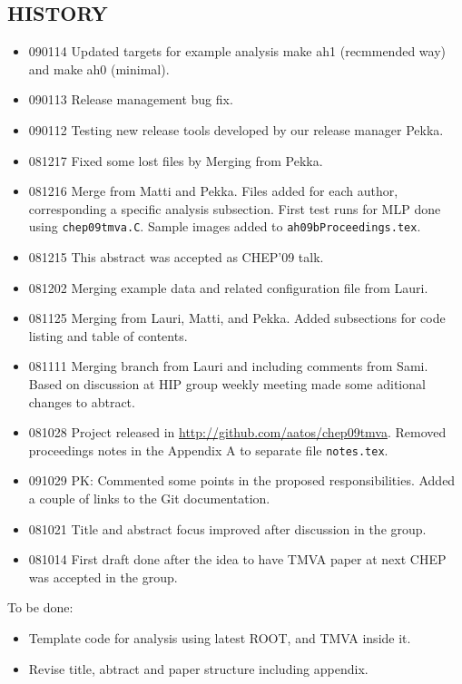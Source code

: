 \begin{appendix}
\section{HISTORY}
\begin{itemize}
\item 090114 Updated targets for example analysis make ah1 (recmmended way) and make ah0 (minimal).
\item 090113 Release management bug fix.
\item 090112 Testing new release tools developed by our release manager Pekka.
\item 081217 Fixed some lost files by Merging from Pekka.
\item 081216 Merge from Matti and Pekka. 
Files added for each author, corresponding a specific analysis subsection.
First test runs for MLP done using {\tt chep09tmva.C}. Sample images added to {\tt ah09bProceedings.tex}.
\item 081215 This abstract was accepted as CHEP'09 talk.
\item 081202 Merging example data and related configuration file from Lauri.
\item 081125 Merging from Lauri, Matti, and Pekka. 
Added subsections for code listing and table of contents.
\item 081111 Merging branch from Lauri and including comments from Sami. 
Based on discussion at HIP group weekly meeting made some aditional changes to abtract.
\item 081028 Project released in \url{http://github.com/aatos/chep09tmva}. Removed proceedings notes in the Appendix A to separate file {\tt notes.tex}.
\item 091029 PK: Commented some points in the proposed
  responsibilities. Added a couple of links to the Git documentation.
\item 081021 Title and abstract focus improved after discussion in the group. 
\item 081014 First draft done after the idea to have TMVA paper at next CHEP was accepted in the group.
\end{itemize}


To be done:
\begin{itemize}
\item Template code for  analysis using latest ROOT, and TMVA inside it.
\item Revise title, abtract and paper structure including appendix.
\end{itemize}

\end{appendix}
